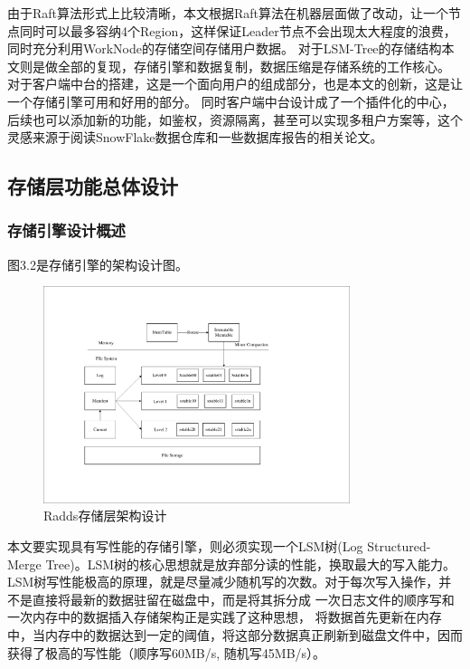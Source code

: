 \begin{enumerate}[fullwidth,itemindent=2em,listparindent=2em]
			由于Raft算法形式上比较清晰，本文根据Raft算法在机器层面做了改动，让一个节点同时可以最多容纳4个Region，这样保证Leader节点不会出现太大程度的浪费，
			同时充分利用WorkNode的存储空间存储用户数据。
			对于LSM-Tree的存储结构本文则是做全部的复现，存储引擎和数据复制，数据压缩是存储系统的工作核心。
			对于客户端中台的搭建，这是一个面向用户的组成部分，也是本文的创新，这是让一个存储引擎可用和好用的部分。
			同时客户端中台设计成了一个插件化的中心，后续也可以添加新的功能，如鉴权，资源隔离，甚至可以实现多租户方案等，这个灵感来源于阅读SnowFlake数据仓库和一些数据库报告的相关论文。
	
		\end{enumerate}
		

		  
	\subsection{存储层功能总体设计}
			



		\subsubsection{存储引擎设计概述}

		图3.2是存储引擎的架构设计图。
		\begin{figure}[H]
			\centering
			\includegraphics[width=0.80\textwidth]{pdf/leveldb_arch.pdf}
			\caption{Radds存储层架构设计}
			\label{mobile_overall_design}
		\end{figure}

		
		本文要实现具有写性能的存储引擎，则必须实现一个LSM树(Log Structured-Merge Tree)。LSM树的核心思想就是放弃部分读的性能，换取最大的写入能力。
		LSM树写性能极高的原理，就是尽量减少随机写的次数。对于每次写入操作，并不是直接将最新的数据驻留在磁盘中，而是将其拆分成
		{一次日志文件的顺序写}和{一次内存中的数据插入}存储架构正是实践了这种思想，
		将数据首先更新在内存中，当内存中的数据达到一定的阈值，将这部分数据真正刷新到磁盘文件中，因而获得了极高的写性能（顺序写60MB/s, 随机写45MB/s）。


